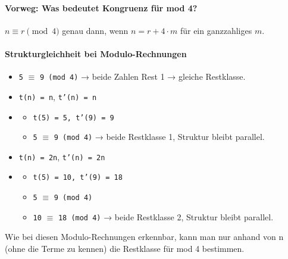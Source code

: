 \documentclass{article}
\begin{document}
      \paragraph{Vorweg: Was bedeutet Kongruenz für mod 4?}
      
      $n \equiv r \pmod{4}$ genau dann, wenn $n = r + 4\cdot m$ für ein ganzzahliges $m$.
      


      \paragraph{
        Strukturgleichheit bei Modulo-Rechnungen
      }

      \begin{itemize}
        \item \texttt{5} $\equiv$ \texttt{9 (mod 4)} → beide Zahlen Rest 1 → gleiche Restklasse.

        \item \texttt{t(n) = n}, \texttt{t'(n) = n}

        \item 
          \begin{itemize}
            \item \texttt{t(5) = 5, t'(9) = 9}

            \item \texttt{5} $\equiv$ \texttt{9 (mod 4)} → beide Restklasse 1, Struktur bleibt parallel.

          \end{itemize}
        

        \item \texttt{t(n) = 2n}, \texttt{t'(n) = 2n}

        \item 
          \begin{itemize}
            \item \texttt{t(5) = 10, t'(9) = 18}

            \item \texttt{5} $\equiv$ \texttt{9 (mod 4)}

            \item \texttt{10} $\equiv$ \texttt{18 (mod 4)} → beide Restklasse 2, Struktur bleibt parallel.

          \end{itemize}
        

      \end{itemize}

      
Wie bei diesen Modulo-Rechnungen erkennbar, kann man nur anhand von n (ohne die Terme zu kennen) die Restklasse für mod 4 bestimmen.
\end{document}
